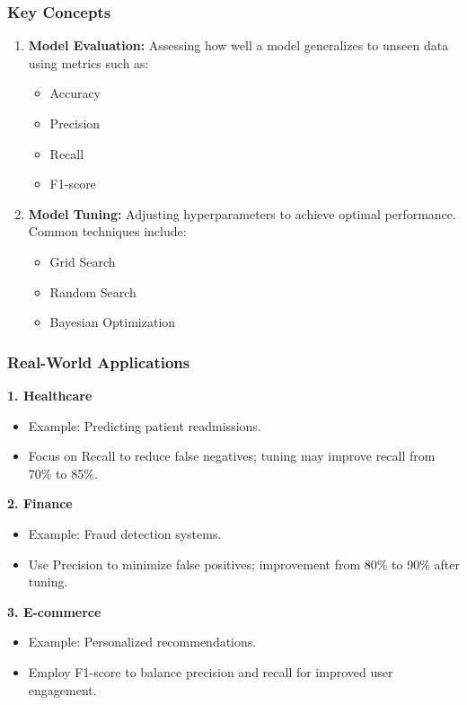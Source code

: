 \documentclass[aspectratio=169]{beamer}
\begin{document}
\begin{frame}[fragile]
    \frametitle{Key Concepts}
    \begin{enumerate}
        \item \textbf{Model Evaluation:} Assessing how well a model generalizes to unseen data using metrics such as:
            \begin{itemize}
                \item Accuracy
                \item Precision
                \item Recall
                \item F1-score
            \end{itemize}
        \item \textbf{Model Tuning:} Adjusting hyperparameters to achieve optimal performance. Common techniques include:
            \begin{itemize}
                \item Grid Search
                \item Random Search
                \item Bayesian Optimization
            \end{itemize}
    \end{enumerate}
\end{frame}

\begin{frame}[fragile]
    \frametitle{Real-World Applications}
    
    \textbf{1. Healthcare}
    \begin{itemize}
        \item Example: Predicting patient readmissions.
        \item Focus on Recall to reduce false negatives; tuning may improve recall from 70\% to 85\%.
    \end{itemize}
    
    \textbf{2. Finance}
    \begin{itemize}
        \item Example: Fraud detection systems.
        \item Use Precision to minimize false positives; improvement from 80\% to 90\% after tuning.
    \end{itemize}

    \textbf{3. E-commerce}
    \begin{itemize}
        \item Example: Personalized recommendations.
        \item Employ F1-score to balance precision and recall for improved user engagement.
    \end{itemize}
\end{frame}
\end{document}
